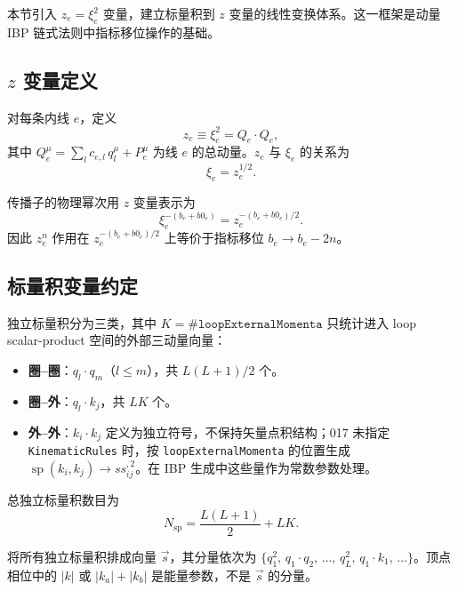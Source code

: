 ﻿\documentclass[a4paper,11pt]{article}
\begin{document}
本节引入 $z_e = \xi_e^2$ 变量，建立标量积到 $z$ 变量的线性变换体系。这一框架是动量 IBP 链式法则中指标移位操作的基础。

\subsection{$z$ 变量定义}

对每条内线 $e$，定义
\begin{equation}
  z_e \equiv \xi_e^2 = Q_e \cdot Q_e,
  \label{zDef}
\end{equation}
其中 $Q_e^\mu = \sum_l c_{e,l}\, q_l^\mu + P_e^\mu$ 为线 $e$ 的总动量。$z_e$ 与 $\xi_e$ 的关系为
\begin{equation}
  \xi_e = z_e^{1/2}.
  \label{xiFromZ}
\end{equation}

传播子的物理幂次用 $z$ 变量表示为
\begin{equation}
  \xi_e^{-(b_e + b0_e)} = z_e^{-(b_e + b0_e)/2}.
  \label{zPower}
\end{equation}
因此 $z_e^n$ 作用在 $z_e^{-(b_e+b0_e)/2}$ 上等价于指标移位 $b_e \to b_e - 2n$。

\subsection{标量积变量约定}

独立标量积分为三类，其中 $K=\#\texttt{loopExternalMomenta}$ 只统计进入 loop scalar-product 空间的外部三动量向量：

\begin{itemize}
  \item \textbf{圈--圈}：$q_l \cdot q_m$（$l \leq m$），共 $L(L+1)/2$ 个。
  \item \textbf{圈--外}：$q_l \cdot k_j$，共 $LK$ 个。
  \item \textbf{外--外}：$k_i \cdot k_j$ 定义为独立符号，不保持矢量点积结构；017 未指定 \texttt{KinematicRules} 时，按 \texttt{loopExternalMomenta} 的位置生成 $\operatorname{sp}(k_i,k_j)\to ss_{ij}^{,2}$。在 IBP 生成中这些量作为常数参数处理。
\end{itemize}

总独立标量积数目为
\begin{equation}
  N_{\text{sp}} = \frac{L(L+1)}{2} + LK.
  \label{Nsp}
\end{equation}

将所有独立标量积排成向量 $\vec{s}$，其分量依次为 $\{q_1^2,\, q_1 \cdot q_2,\, \ldots,\, q_L^2,\, q_1 \cdot k_1,\, \ldots\}$。顶点相位中的 $|k|$ 或 $|k_a|+|k_b|$ 是能量参数，不是 $\vec{s}$ 的分量。
\end{document}
